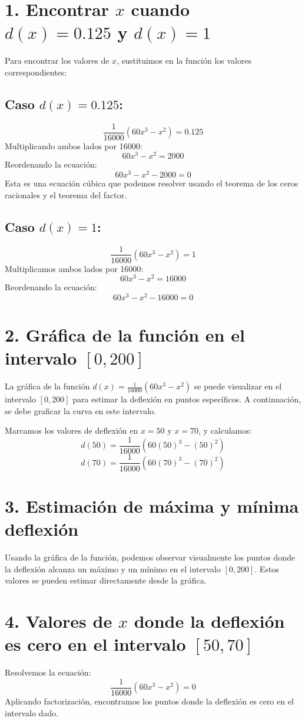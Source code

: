 \documentclass{article}
\begin{document}
\section*{1. Encontrar \( x \) cuando \( d(x) = 0.125 \) y \( d(x) = 1 \)}
Para encontrar los valores de \( x \), sustituimos en la función los valores correspondientes:

\subsection*{Caso \( d(x) = 0.125 \):}
\[
\frac{1}{16000}(60x^3 - x^2) = 0.125
\]
Multiplicando ambos lados por 16000:
\[
60x^3 - x^2 = 2000
\]
Reordenando la ecuación:
\[
60x^3 - x^2 - 2000 = 0
\]
Esta es una ecuación cúbica que podemos resolver usando el teorema de los ceros racionales y el teorema del factor.

\subsection*{Caso \( d(x) = 1 \):}
\[
\frac{1}{16000}(60x^3 - x^2) = 1
\]
Multiplicamos ambos lados por 16000:
\[
60x^3 - x^2 = 16000
\]
Reordenando la ecuación:
\[
60x^3 - x^2 - 16000 = 0
\]

\section*{2. Gráfica de la función en el intervalo \([0, 200]\)}
La gráfica de la función \( d(x) = \frac{1}{16000}(60x^3 - x^2) \) se puede visualizar en el intervalo \([0, 200]\) para estimar la deflexión en puntos específicos. A continuación, se debe graficar la curva en este intervalo.

Marcamos los valores de deflexión en \( x = 50 \) y \( x = 70 \), y calculamos:
\[
d(50) = \frac{1}{16000}(60(50)^3 - (50)^2)
\]
\[
d(70) = \frac{1}{16000}(60(70)^3 - (70)^2)
\]

\section*{3. Estimación de máxima y mínima deflexión}
Usando la gráfica de la función, podemos observar visualmente los puntos donde la deflexión alcanza un máximo y un mínimo en el intervalo \([0, 200]\). Estos valores se pueden estimar directamente desde la gráfica.

\section*{4. Valores de \( x \) donde la deflexión es cero en el intervalo \([50, 70]\)}
Resolvemos la ecuación:
\[
\frac{1}{16000}(60x^3 - x^2) = 0
\]
Aplicando factorización, encontramos los puntos donde la deflexión es cero en el intervalo dado.
\end{document}
